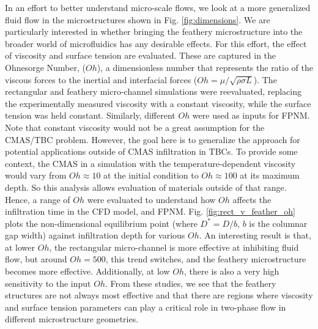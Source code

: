 \documentclass[%
 aip,
 amsmath,amssymb,
 reprint,%
floatfix]{revtex4-1}
\begin{document}
In an effort to better understand micro-scale flows, we look at a more generalized fluid flow in the microstructures shown in Fig. \ref{fig:dimensions}. We are particularly interested in whether bringing the feathery microstructure into the broader world of microfluidics has any desirable effects. For this effort, the effect of viscosity and surface tension are evaluated. These are captured in the Ohnesorge Number, ($Oh$), a dimensionless number that represents the ratio of the viscous forces to the inertial and interfacial forces ($Oh = \mu / \sqrt{\rho \sigma L}$). 
The rectangular and feathery micro-channel simulations were reevaluated, replacing the experimentally measured viscosity with a constant viscosity, while the surface tension was held constant.
Similarly, different $Oh$ were used as inputs for FPNM.
Note that constant viscosity would not be a great assumption for the CMAS/TBC problem. However, the goal here is to generalize the approach for potential applications outside of CMAS infiltration in TBCs.
To provide some context, the CMAS in a simulation with the temperature-dependent viscosity would vary from 
$Oh\approx 10$ at the initial condition to $Oh \approx 100$ at its maximum depth. So this analysis allows evaluation of materials outside of that range.
Hence, a range of $Oh$ were evaluated to understand how $Oh$ affects the infiltration time in the CFD model, and FPNM. 
Fig. \ref{fig:rect_v_feather_oh} plots the non-dimensional equilibrium point (where $D^{*} = D/b$, $b$ is the columnar gap width) against infiltration depth for various $Oh$. 
An interesting result is that, at lower $Oh$, the rectangular micro-channel is more effective at inhibiting fluid flow, but around $Oh=500$, this trend switches, and the feathery microstructure becomes more effective. Additionally, at low $Oh$, there is also a very high sensitivity to the input $Oh$.  
From these studies, we see that the feathery structures are not always most effective and that there are regions where viscosity and surface tension parameters can play a critical role in two-phase flow in different microstructure geometries. 
\end{document}
